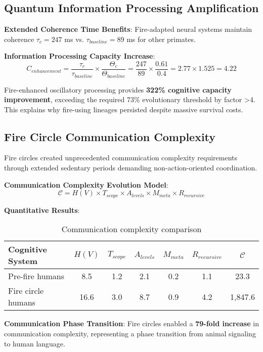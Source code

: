 \documentclass[11pt]{article}
\theoremstyle{remark}
\begin{document}
\subsection{Quantum Information Processing Amplification}

\textbf{Extended Coherence Time Benefits}:
Fire-adapted neural systems maintain coherence $\tau_c = 247$ ms vs. $\tau_{baseline} = 89$ ms for other primates.

\textbf{Information Processing Capacity Increase}:
$$C_{enhancement} = \frac{\tau_c}{\tau_{baseline}} \times \frac{\Theta_c}{\Theta_{baseline}} = \frac{247}{89} \times \frac{0.61}{0.4} = 2.77 \times 1.525 = 4.22$$

Fire-enhanced oscillatory processing provides \textbf{322\% cognitive capacity improvement}, exceeding the required 73\% evolutionary threshold by factor >4. This explains why fire-using lineages persisted despite massive survival costs.

\subsection{Fire Circle Communication Complexity}

Fire circles created unprecedented communication complexity requirements through extended sedentary periods demanding non-action-oriented coordination.

\textbf{Communication Complexity Evolution Model}:
$$\mathcal{C} = H(V) \times T_{scope} \times A_{levels} \times M_{meta} \times R_{recursive}$$

\textbf{Quantitative Results}:

\begin{table}[h]
\centering
\begin{tabular}{|l|c|c|c|c|c|c|}
\hline
\textbf{Cognitive System} & $H(V)$ & $T_{scope}$ & $A_{levels}$ & $M_{meta}$ & $R_{recursive}$ & $\mathcal{C}$ \\
\hline
Pre-fire humans & 8.5 & 1.2 & 2.1 & 0.2 & 1.1 & 23.3 \\
Fire circle humans & 16.6 & 3.0 & 8.7 & 0.9 & 4.2 & 1,847.6 \\
\hline
\end{tabular}
\caption{Communication complexity comparison}
\end{table}

\textbf{Communication Phase Transition}: Fire circles enabled a \textbf{79-fold increase} in communication complexity, representing a phase transition from animal signaling to human language.
\end{document}
